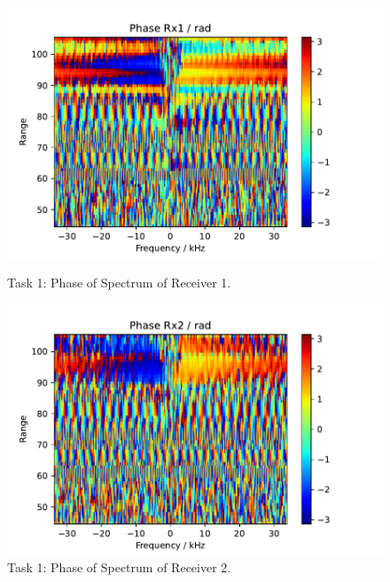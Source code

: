 \begin{figure}
    \centering
    \begin{minipage}{0.48\textwidth}
        \centering
        \includegraphics[width=\textwidth]{graphics/t1/t1-phase-rx1.pdf}
    \caption{Task 1: Phase of Spectrum of Receiver 1.}
    \label{fig:t1-phase-rx1}
    \end{minipage}\hfill
    \begin{minipage}{0.48\textwidth}
        \centering
        \includegraphics[width=\textwidth]{graphics/t1/t1-phase-rx2.pdf}
    \caption{Task 1: Phase of Spectrum of Receiver 2.}
    \label{fig:t1-phase-rx2}
    \end{minipage}
\end{figure}
